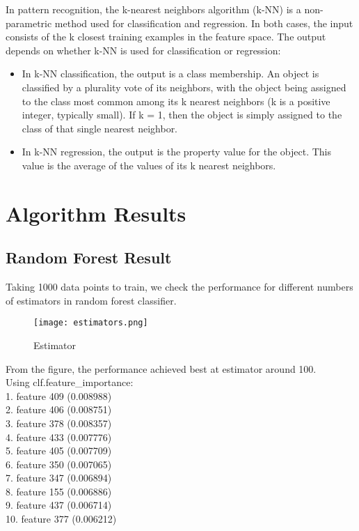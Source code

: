 \documentclass{article}
\begin{document}
In pattern recognition, the k-nearest neighbors algorithm (k-NN) is a non-parametric method used for classification and regression. In both cases, the input consists of the k closest training examples in the feature space. The output depends on whether k-NN is used for classification or regression:\\

\begin{itemize}
\item In k-NN classification, the output is a class membership. An object is classified by a plurality vote of its neighbors, with the object being assigned to the class most common among its k nearest neighbors (k is a positive integer, typically small). If k = 1, then the object is simply assigned to the class of that single nearest neighbor.\\
\item In k-NN regression, the output is the property value for the object. This value is the average of the values of its k nearest neighbors.\\
\end{itemize}



\section{Algorithm Results}
\subsection{Random Forest Result}
Taking 1000 data points to train, we check the performance for different numbers of estimators in random forest classifier.\\

\begin{figure}[H]
\centering
\texttt{[image: estimators.png]}
\caption{Estimator}
\label{fig4.1}
\end{figure}

From the figure, the performance achieved best at estimator around 100.\\
Using clf.feature\_importance:\\

1. feature 409 (0.008988)\\
2. feature 406 (0.008751)\\
3. feature 378 (0.008357)\\
4. feature 433 (0.007776)\\
5. feature 405 (0.007709)\\
6. feature 350 (0.007065)\\
7. feature 347 (0.006894)\\
8. feature 155 (0.006886)\\
9. feature 437 (0.006714)\\
10. feature 377 (0.006212)\\
\end{document}
